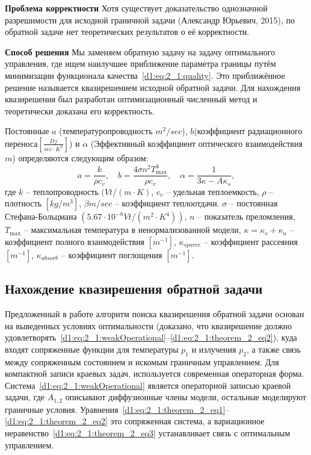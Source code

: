 \documentclass[8pt,a4paper]{article}
\begin{document}
    \textbf{Проблема корректности}
    Хотя существует доказательство однозначной разрешимости для исходной граничной задачи (Александр Юрьевич, 2015),
    по обратной задаче нет теоретических результатов о её корректности.

    \textbf{Способ решения}
    Мы заменяем обратную задачу на задачу оптимального управления, где ищем наилучшее
    приближение параметра границы путём минимизации функционала качества~\eqref{d1:eq:2_1:quality}.
    Это приближённое решение называется квазирешением исходной обратной задачи.
    Для нахождения квазирешения был разработан оптимизационный численный метод и теоретически доказана его корректность.

    Постоянные $a$ (температуропроводность $m^2/sec$), $b$(коэффициент радиационного переноса$[\frac{Dj}{sec \cdot K^2}]$) и
    $\alpha$ (Эффективный коэффициент оптического взаимодействия $m$)
    определяются следующим образом:
    \[
        a = \frac{k}{\rho c_v},\quad b = \frac{4\sigma n^2 T_{\max}^3}{\rho c_v},
        \quad \alpha=\frac{1}{3\kappa - A \kappa_s},
    \]
    где $k$ -- теплопроводность $(Vt/(m \cdot K)$, $c_v$ -- удельная теплоемкость,
    $\rho$ -- плотность $[kg/m^3]$,
    $\beta m/sec$ -- коэффициент теплоотдачи.
    $\sigma$ -- постоянная Стефана-Больцмана $(5.67 \cdot 10^{-8}Vt/(m^2 \cdot K^4))$,
    $n$ -- показатель преломления,
    $T_{\max}$ -- максимальная температура в ненормализованной модели,
    $\kappa = \kappa_s + \kappa_a$ -- коэффициент
    полного взаимодействия $[m^{-1}]$,
    $\kappa_{sparce}$ -- коэффициент рассеяния $[m^{-1}]$, $\kappa_{absorb}$ -- коэффициент поглощения $[m^{-1}]$.

    \subsection*{Нахождение квазирешения обратной задачи}
    Предложенный в работе алгоритм поиска квазирешения обратной задачи основан
    на выведенных условиях оптимальности
    (доказано, что квазирешение должно
    удовлетворять~\eqref{d1:eq:2_1:weakOperational}--\eqref{d1:eq:2_1:theorem_2_eq2}),
    куда входят сопряженные функции для температуры $p_1$ и излучения $p_2$,
    а также связь между сопряженным состоянием и искомым граничным управлением.
    Для компактной записи краевых задач, используется современная операторная форма.
    Система~\eqref{d1:eq:2_1:weakOperational} является операторной записью краевой задачи,
    где $A_{1,2}$ описывают диффузионные члены модели, остальные моделируют граничные условия.
    Уравнения~\eqref{d1:eq:2_1:theorem_2_eq1}--\eqref{d1:eq:2_1:theorem_2_eq2}
    это сопряженная система,
    а вариационное неравенство~\eqref{d1:eq:2_1:theorem_2_eq3}
    устанавливает связь с оптимальным управлением.
\end{document}

